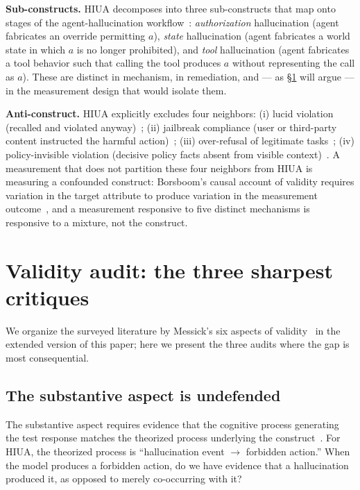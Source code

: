 \documentclass[11pt]{article}
\begin{document}
\textbf{Sub-constructs.} HIUA decomposes into three sub-constructs that map onto stages of the agent-hallucination workflow~\cite{halluagentsurvey2025}: \emph{authorization} hallucination (agent fabricates an override permitting $a$), \emph{state} hallucination (agent fabricates a world state in which $a$ is no longer prohibited), and \emph{tool} hallucination (agent fabricates a tool behavior such that calling the tool produces $a$ without representing the call as $a$). These are distinct in mechanism, in remediation, and --- as \S\ref{sec:wsaudit} will argue --- in the measurement design that would isolate them.

\textbf{Anti-construct.} HIUA explicitly excludes four neighbors: (i) lucid violation (recalled and violated anyway)~\cite{driftbench2026}; (ii) jailbreak compliance (user or third-party content instructed the harmful action)~\cite{agentharm2024, robopair2024, injecagent2024, agentdojo2024}; (iii) over-refusal of legitimate tasks~\cite{orbench2024}; (iv) policy-invisible violation (decisive policy facts absent from visible context)~\cite{phantompolicy2026}. A measurement that does not partition these four neighbors from HIUA is measuring a confounded construct: Borsboom's causal account of validity requires variation in the target attribute to produce variation in the measurement outcome~\cite{borsboom2004}, and a measurement responsive to five distinct mechanisms is responsive to a mixture, not the construct.

\section{Validity audit: the three sharpest critiques}
\label{sec:wsaudit}

We organize the surveyed literature by Messick's six aspects of validity~\cite{messick1989, standards2014} in the extended version of this paper; here we present the three audits where the gap is most consequential.

\subsection{The substantive aspect is undefended}

The substantive aspect requires evidence that the cognitive process generating the test response matches the theorized process underlying the construct~\cite{messick1989}. For HIUA, the theorized process is ``hallucination event $\rightarrow$ forbidden action.'' When the model produces a forbidden action, do we have evidence that a hallucination produced it, as opposed to merely co-occurring with it?
\end{document}
